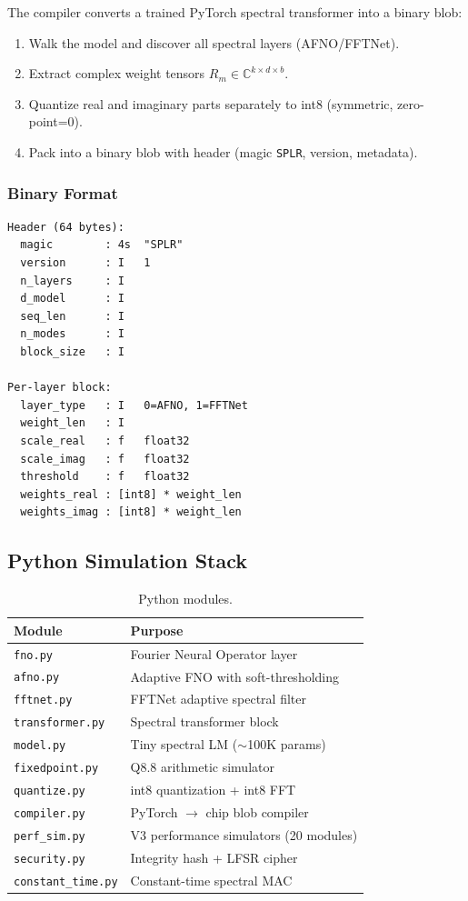 \documentclass[11pt,a4paper]{article}
\theoremstyle{definition}
\theoremstyle{remark}
\newcommand{\C}{\mathbb{C}}
\begin{document}
The compiler converts a trained PyTorch spectral transformer into a binary blob:
\begin{enumerate}[noitemsep]
  \item Walk the model and discover all spectral layers (AFNO/FFTNet).
  \item Extract complex weight tensors $R_m \in \C^{k \times d \times b}$.
  \item Quantize real and imaginary parts separately to int8 (symmetric, zero-point=0).
  \item Pack into a binary blob with header (magic \texttt{SPLR}, version, metadata).
\end{enumerate}

\subsubsection{Binary Format}
\begin{verbatim}
Header (64 bytes):
  magic        : 4s  "SPLR"
  version      : I   1
  n_layers     : I
  d_model      : I
  seq_len      : I
  n_modes      : I
  block_size   : I

Per-layer block:
  layer_type   : I   0=AFNO, 1=FFTNet
  weight_len   : I
  scale_real   : f   float32
  scale_imag   : f   float32
  threshold    : f   float32
  weights_real : [int8] * weight_len
  weights_imag : [int8] * weight_len
\end{verbatim}

\subsection{Python Simulation Stack}

\begin{table}[h]
\centering
\caption{Python modules.}
\label{tab:python}
\begin{tabular}{ll}
\toprule
\textbf{Module} & \textbf{Purpose} \\
\midrule
\texttt{fno.py} & Fourier Neural Operator layer \\
\texttt{afno.py} & Adaptive FNO with soft-thresholding \\
\texttt{fftnet.py} & FFTNet adaptive spectral filter \\
\texttt{transformer.py} & Spectral transformer block \\
\texttt{model.py} & Tiny spectral LM ($\sim$100K params) \\
\texttt{fixedpoint.py} & Q8.8 arithmetic simulator \\
\texttt{quantize.py} & int8 quantization + int8 FFT \\
\texttt{compiler.py} & PyTorch $\to$ chip blob compiler \\
\texttt{perf\_sim.py} & V3 performance simulators (20 modules) \\
\texttt{security.py} & Integrity hash + LFSR cipher \\
\texttt{constant\_time.py} & Constant-time spectral MAC \\
\bottomrule
\end{tabular}
\end{table}
\end{document}
